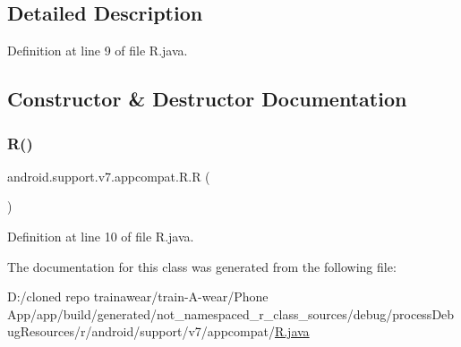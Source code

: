 \subsection{Detailed Description}


Definition at line 9 of file R.\+java.



\subsection{Constructor \& Destructor Documentation}
\mbox{\label{classandroid_1_1support_1_1v7_1_1appcompat_1_1_r_a1f2b7247035e93db2996bdfd46e318ae}} 
\subsubsection{\texorpdfstring{R()}{R()}}
{\footnotesize\ttfamily android.\+support.\+v7.\+appcompat.\+R.\+R (\begin{DoxyParamCaption}{ }\end{DoxyParamCaption})\hspace{0.3cm}{\ttfamily [private]}}



Definition at line 10 of file R.\+java.


\begin{DoxyCode}{0}

\end{DoxyCode}


The documentation for this class was generated from the following file\+:\begin{DoxyCompactItemize}
\item 
D\+:/cloned repo trainawear/train-\/\+A-\/wear/\+Phone App/app/build/generated/not\+\_\+namespaced\+\_\+r\+\_\+class\+\_\+sources/debug/process\+Debug\+Resources/r/android/support/v7/appcompat/\mbox{\hyperlink{process_debug_resources_2r_2android_2support_2v7_2appcompat_2_r_8java}{R.\+java}}\end{DoxyCompactItemize}
